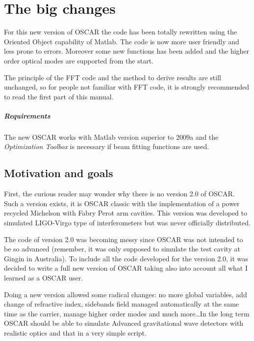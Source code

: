 

\chapter{The big changes}

For this new version of OSCAR the code has been totally rewritten using the Oriented Object capability of Matlab. The code is now more user friendly and less prone to errors. Moreover some new functions has been added and the higher order optical modes are supported from the start.

The principle of the FFT code and the method to derive results are still unchanged, so for people not familiar with FFT code, it is strongly recommended to read the first part of this manual.

\paragraph{Requirements} The new OSCAR works with Matlab version superior to 2009a and the \textsl{Optimization Toolbox} is necessary if beam fitting functions are used.

\section{Motivation and goals}

 First, the curious reader may wonder why there is no version 2.0 of OSCAR. Such a version exists, it is OSCAR classic with the implementation of a power recycled Michelson with Fabry Perot arm cavities. This version was developed to simulated LIGO-Virgo type of interferometers but was never officially distributed.

 The code of version 2.0 was becoming messy since OSCAR was not intended to be so advanced (remember, it was only supposed to simulate the test cavity at Gingin in Australia). To include all the code developed for the version 2.0, it was decided to write a full new version of OSCAR taking also into account all what I learned as a OSCAR user.

 Doing a new version allowed some radical changes: no more global variables, add change of refractive index, sidebands field managed automatically at the same time as the carrier, manage higher order modes and much more\dots In the long term OSCAR should be able to simulate Advanced gravitational wave detectors with realistic optics and that in a very simple script.

